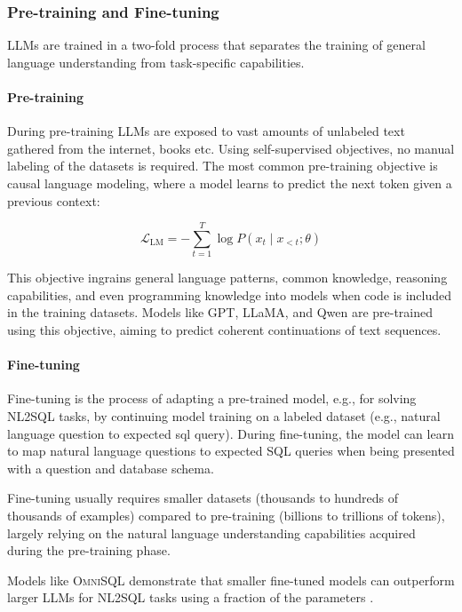 \subsubsection{Pre-training and Fine-tuning}

LLMs are trained in a two-fold process that separates the training of general
language understanding from task-specific capabilities.

\paragraph{Pre-training}

During pre-training LLMs are exposed to vast amounts of unlabeled text
gathered from the internet, books etc. Using self-supervised objectives, no
manual labeling of the datasets is required. The most common pre-training
objective is causal language modeling, where a model learns to predict the next
token given a previous context:

\begin{equation}
\mathcal{L}_{\text{LM}} = -\sum_{t=1}^{T} \log P(x_t \mid x_{<t}; \theta)
\end{equation}

This objective ingrains general language patterns, common knowledge,
reasoning capabilities, and even programming knowledge into models 
when code is included in the training datasets. Models like GPT, LLaMA, and
Qwen are pre-trained using this objective, aiming to predict coherent
continuations of text sequences.

\paragraph{Fine-tuning}

Fine-tuning is the process of adapting a pre-trained model, e.g., for
solving NL2SQL tasks, by continuing model training on a labeled dataset
(e.g., natural language question to expected sql query). During fine-tuning,
the model can learn to map natural language questions to expected SQL queries
when being presented with a question and database schema.

Fine-tuning usually requires smaller datasets (thousands to hundreds of
thousands of examples) compared to pre-training (billions to trillions of
tokens), largely relying on the natural language understanding capabilities
acquired during the pre-training phase.

Models like \textsc{OmniSQL} demonstrate that smaller fine-tuned models can
outperform larger LLMs for NL2SQL tasks using a fraction of the parameters
\citep{OmniSQL}.

